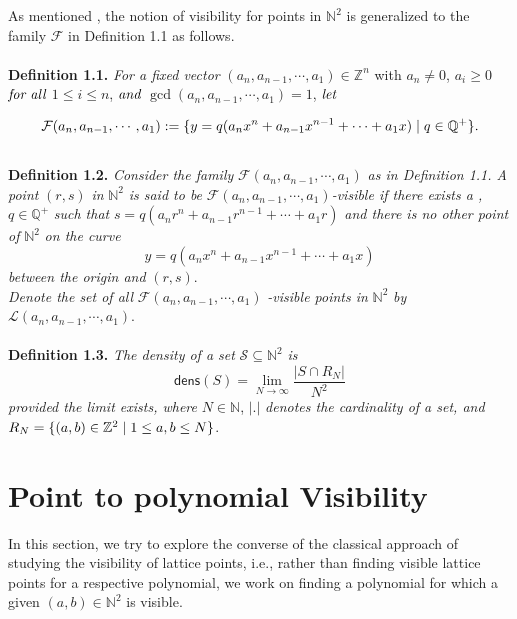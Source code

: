 \documentclass[12pt, reqno]{amsart}
\theoremstyle{definition}
\theoremstyle{remark}
\numberwithin{equation}{section}
\begin{document}
As mentioned , the notion of visibility  for points in $\mathbb{N}^{2}$  is generalized to the family $\mathcal{F}$ in Definition 1.1 as follows.\\
\\
\textbf{Definition 1.1.} \emph{For a fixed vector} $(a_n, a_{n-1},\cdots , a_1) \in \mathbb{Z}^{n}$ with $a_n \neq 0$, $a_i \ge 0$ $\emph{for all}$ $1 \leq i \leq n$, $\emph{and}$ $\gcd(a_n, a_{n-1}, \cdots, a_1) = 1$, $\emph{let}$

$$\mathcal{F}(a_n, a_{n-1}, \cdots , a_1) := \{y = q(a_nx^{n} + a_{n-1}x^{n-1} + \cdots + a_1x) \hspace{0.1cm} | \hspace{0.1cm} q \in \mathbb{Q}^{+}
\}.$$\\
\textbf{Definition 1.2.} \emph{Consider the family} $\mathcal{F}(a_n, a_{n-1}, \cdots , a_1)$ \emph{as in Definition 1.1. A point} $(r, s)$ \emph{in} $\mathbb{N}^2$ \emph{is said to be} $\mathcal{F}(a_n, a_{n-1}, \cdots , a_1)$\emph{-visible if there exists a ,} $q \in \mathbb{Q}^{+}$ \emph{such that} $s = q(a_{n}r^{n} +a_{n-1}r^{n-1} +\cdots +a_1r)$ \emph{and there is no other point of} $\mathbb{N}^{2}$ \emph{on the curve} $$y = q(a_nx^{n} + a_{n-1}x^{n-1} + \cdots + a_1x)$$ \emph{between the origin and} $(r, s)$. \\ \emph{Denote the set of all} $\mathcal{F}(a_n, a_{n-1}, \cdots , a_1)$ \emph{-visible points in} $\mathbb{N}^{2}$ \emph{by}  $\mathcal{L}(a_n, a_{n-1}, \cdots , a_1).$\\
\\
\textbf{Definition 1.3.} \emph{The density of a set} $\mathcal{S} \subseteq \mathbb{N}^{2}$
\emph{is} $$\mathsf{dens}(S) = \lim_{ N \rightarrow \infty} \frac{|S  \cap R_{N} |}{N^2}$$
\emph{provided the limit exists, where} $N \in \mathbb{N}$, $\left| .\right|$ \emph{denotes the cardinality of a set, and} $R_{N} = \{(a, b) \in \mathbb{Z}^{2}
 \hspace{0.1cm} | \hspace{0.1cm}  1 \leq a, b \leq N\}$. \\

\section{Point to polynomial Visibility}
In this section, we try to explore the converse of the classical approach of studying the visibility of lattice points, i.e., rather than finding visible lattice points for a respective polynomial, we work on finding a polynomial for which a given $(a,b) \in \mathbb{N}^{2}$ is visible.\\
\end{document}

